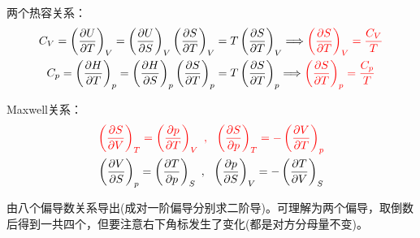 \documentclass[zihao=5,UTF8]{report}
\begin{document}
两个热容关系：
\begin{gather}
    C_V = \left(\frac{\partial U }{\partial T }\right)_{V} =  \left(\frac{\partial U }{\partial S }\right)_{V} \left(\frac{\partial S }{\partial T }\right)_{V} = T \left(\frac{\partial S }{\partial T }\right)_{V}
    \Longrightarrow {\color{red}\left(\frac{\partial S}{\partial T}\right)_V = \frac{C_V}{T} }
    \\
    C_p = \left(\frac{\partial H }{\partial T }\right)_{p} =  \left(\frac{\partial H }{\partial S }\right)_{p} \left(\frac{\partial S }{\partial T }\right)_{p} = T \left(\frac{\partial S }{\partial T }\right)_{p}
    \Longrightarrow  {\color{red}\left(\frac{\partial S}{\partial T}\right)_p =\frac{C_p}{T} }
\end{gather}

Maxwell关系：
\begin{gather}
    {\color{red}
    \left(\frac{\partial S}{\partial V}\right)_T =\left(\frac{\partial p}{\partial T}\right)_V\ ,\ \ \left(\frac{\partial S}{\partial p}\right)_T = -\left(\frac{\partial V}{\partial T}\right)_p
    }
    \\
    \left(\frac{\partial V}{\partial S}\right)_p = \left(\frac{\partial T}{\partial p}\right)_S  \ ,\ \  \left(\frac{\partial p}{\partial S}\right)_V = - \left(\frac{\partial T}{\partial V}\right)_S
\end{gather}
{\par\color{gray}\small
由八个偏导数关系导出(成对一阶偏导分别求二阶导)。可理解为两个偏导，取倒数后得到一共四个，但要注意右下角标发生了变化(都是对方分母量不变)。
\par}
\end{document}
